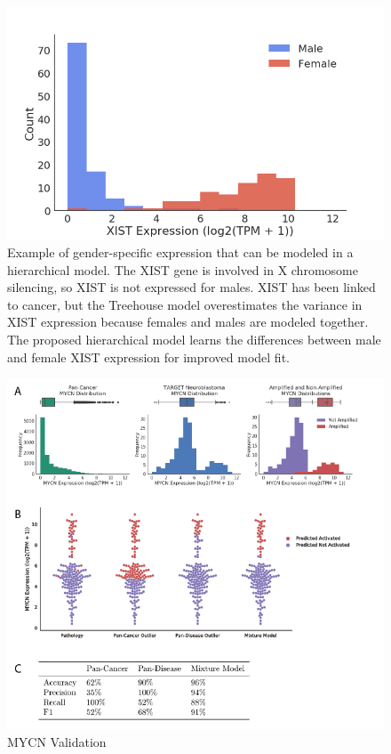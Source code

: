 \documentclass[fleqn,10pt]{wlscirep}
\begin{document}

\begin{figure}
\centering
\includegraphics[width=0.75\linewidth]{images/xist-fig-2017-12-28.png}
\caption{Example of gender-specific expression that can be modeled in a hierarchical model. The XIST gene is involved in X chromosome silencing, so XIST is not expressed for males. XIST has been linked to cancer, but the Treehouse model overestimates the variance in XIST expression because females and males are modeled together. The proposed hierarchical model learns the differences between male and female XIST expression for improved model fit.}
\label{sfig:xist}
\end{figure}



\begin{figure}
	\centering
	\includegraphics[width=0.75\linewidth]{images/MYCN-Figure.png}
	\caption{MYCN Validation}
	\label{sfig:mycn}
\end{figure}
\end{document}
